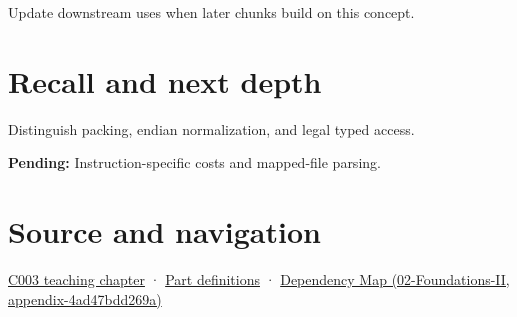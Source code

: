 Update downstream uses when later chunks build on this concept.

\section{Recall and next depth}\label{appendix-0682dbfc5f0e-recall-and-next-depth}

Distinguish packing, endian normalization, and legal typed access.

\textbf{Pending:} Instruction-specific costs and mapped-file parsing.

\section{Source and navigation}\label{appendix-0682dbfc5f0e-source-and-navigation}

\href{Continuous\%20Notes/Computing\%20Foundations\%20-\%20From\%20Bits\%20to\%20C++\%20and\%20Systems\%20APIs\#Where\%20the\%20bytes\%20live}{C003 teaching chapter} · \hyperref[appendix-fd090d982a15-m003---parts-41-60]{Part definitions} · \href{../02-Foundations-II/main.pdf\#nameddest=appendix-4ad47bdd269a}{Dependency Map (02-Foundations-II, appendix-4ad47bdd269a)}
